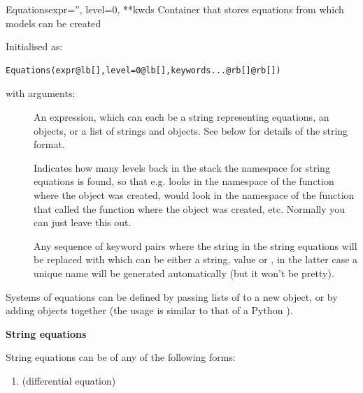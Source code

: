 \documentclass[letterpaper,10pt]{manual}
\begin{document}
\hypertarget{brian.Equations}{}\begin{classdesc}{Equations}{expr='', level=0, **kwds}
Container that stores equations from which models can be created

Initialised as:

\begin{Verbatim}[commandchars=@\[\]]
Equations(expr@lb[],level=0@lb[],keywords...@rb[]@rb[])
\end{Verbatim}

with arguments:
\begin{description}
\item[]
An expression, which can each be a string representing equations,
an \hyperlink{brian.Equations}{} objects, or a list of strings and \hyperlink{brian.Equations}{} objects.
See below for details of the string format.

\item[]
Indicates how many levels back in the stack the namespace for string
equations is found, so that e.g.  looks in the
namespace of the function where the \hyperlink{brian.Equations}{} object was created,
 would look in the namespace of the function that called the
function where the \hyperlink{brian.Equations}{} object was created, etc.
Normally you can just leave this out.

\item[]
Any sequence of keyword pairs  where the string 
in the string equations will be replaced with  which can
be either a string, value or , in the latter case a unique
name will be generated automatically (but it won't be pretty).

\end{description}

Systems of equations can be defined by passing lists of \hyperlink{brian.Equations}{} to a
new \hyperlink{brian.Equations}{} object, or by adding \hyperlink{brian.Equations}{} objects together (the usage
is similar to that of a Python ).

\textbf{String equations}

String equations can be of any of the following forms:
\begin{enumerate}
\item {} 
 (differential equation)


\end{enumerate}
\end{classdesc}
\end{document}

